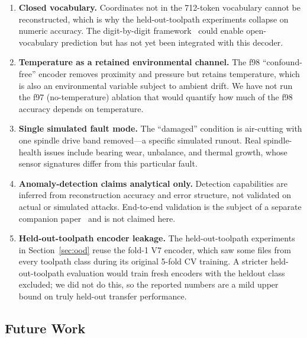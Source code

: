 \documentclass[sensors,article,submit,moreauthors,pdftex]{Definitions/mdpi}
\begin{document}
\begin{enumerate}[leftmargin=*]
    \item \textbf{Closed vocabulary.} Coordinates not in the 712-token vocabulary cannot be reconstructed, which is why the held-out-toolpath experiments collapse on numeric accuracy. The digit-by-digit framework~\cite{grammar_paper} could enable open-vocabulary prediction but has not yet been integrated with this decoder.
    \item \textbf{Temperature as a retained environmental channel.} The f98 ``confound-free'' encoder removes proximity and pressure but retains temperature, which is also an environmental variable subject to ambient drift. We have not run the f97 (no-temperature) ablation that would quantify how much of the f98 accuracy depends on temperature.
    \item \textbf{Single simulated fault mode.} The ``damaged'' condition is air-cutting with one spindle drive band removed---a specific simulated runout. Real spindle-health issues include bearing wear, unbalance, and thermal growth, whose sensor signatures differ from this particular fault.
    \item \textbf{Anomaly-detection claims analytical only.} Detection capabilities are inferred from reconstruction accuracy and error structure, not validated on actual or simulated attacks. End-to-end validation is the subject of a separate companion paper~\cite{anomaly_paper} and is not claimed here.
    \item \textbf{Held-out-toolpath encoder leakage.} The held-out-toolpath experiments in Section~\ref{sec:ood} reuse the fold-1 V7 encoder, which saw some files from every toolpath class during its original 5-fold CV training. A stricter held-out-toolpath evaluation would train fresh encoders with the heldout class excluded; we did not do this, so the reported numbers are a mild upper bound on truly held-out transfer performance.
\end{enumerate}

\subsection{Future Work}
\end{document}
